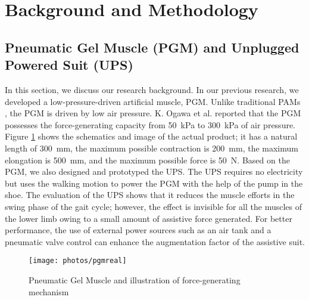 \documentclass[paper,JRM,paper]{jaciiiarticle}
\begin{document}
\section{Background and Methodology}

\subsection{Pneumatic Gel Muscle (PGM) and Unplugged Powered Suit (UPS)}
In this section, we discuss our research background. In our previous research\cite{11}, we developed a low-pressure-driven artificial muscle, PGM. Unlike traditional PAMs \cite{11}, the PGM is driven by low air pressure. K. Ogawa et al. reported that the PGM possesses the force-generating capacity from \SI{50}{\kilo\pascal} to \SI{300}{\kilo\pascal} of air pressure. Figure \ref{fig:pgmreal} shows the schematics and image of the actual product; it has a natural length of \SI{300}{\milli\meter}, the maximum possible contraction is \SI{200}{\milli\meter}, the maximum elongation is \SI{500}{\milli\meter}, and the maximum possible force is \SI{50}{\newton}. Based on the PGM, we also designed and prototyped the UPS. The UPS requires no electricity but uses the walking motion to power the PGM with the help of the pump in the shoe. The evaluation of the UPS shows that it reduces the muscle efforts in the swing phase of the gait cycle; however, the effect is invisible for all the muscles of the lower limb owing to a small amount of assistive force generated. For better performance, the use of external power sources such as an air tank and a pneumatic valve control can enhance the augmentation factor of the assistive suit. 

\begin{figure}
	\centering
	\texttt{[image: photos/pgmreal]}
	\caption{Pneumatic Gel Muscle and illustration of force-generating mechanism}
	\label{fig:pgmreal}
\end{figure}
\end{document}
